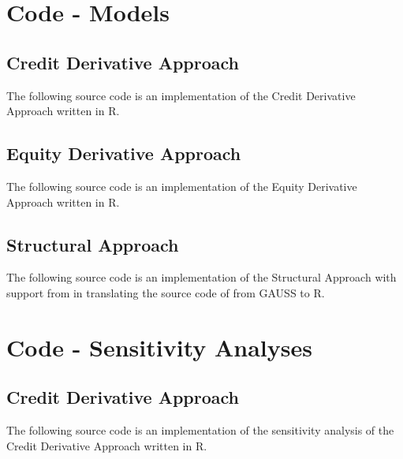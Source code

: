 \chapter{Code - Models} \label{creditderivativeapproach}
\section{Credit Derivative Approach} \label{creditderivativeapproach}

The following source code is an implementation of the Credit Derivative Approach \citep{de2011pricing} written in R.
 


\section{Equity Derivative Approach} \label{equityderivativeapproach}

The following source code is an implementation of the Equity Derivative Approach \citep{de2011pricing} written in R.
 


\section{Structural Approach} \label{structuralapproach}

The following source code is an implementation of the Structural Approach \citep{pennacchi2010structural} with support from \citet{codestructrural} in translating the source code of \citet{pennacchi2010structural} from GAUSS to R.
 


\chapter{Code - Sensitivity Analyses}

\section{Credit Derivative Approach} \label{sensicredit}

The following source code is an implementation of the sensitivity analysis of the Credit Derivative Approach \citep{de2011pricing} written in R.
 


